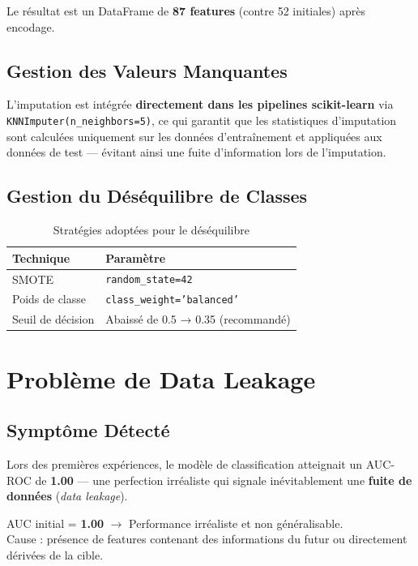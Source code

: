 \documentclass[12pt,a4paper]{article}
\begin{document}
Le résultat est un DataFrame de \textbf{87 features} (contre 52 initiales) après encodage.

\subsection{Gestion des Valeurs Manquantes}

L'imputation est intégrée \textbf{directement dans les pipelines scikit-learn} via
\texttt{KNNImputer(n\_neighbors=5)}, ce qui garantit que les statistiques d'imputation
sont calculées uniquement sur les données d'entraînement et appliquées aux données de test
— évitant ainsi une fuite d'information lors de l'imputation.

\subsection{Gestion du Déséquilibre de Classes}

\begin{table}[H]
\centering
\caption{Stratégies adoptées pour le déséquilibre}
\begin{tabular}{ll}
\toprule
\textbf{Technique} & \textbf{Paramètre} \\
\midrule
SMOTE & \texttt{random\_state=42} \\
Poids de classe & \texttt{class\_weight='balanced'} \\
Seuil de décision & Abaissé de 0.5 → 0.35 (recommandé) \\
\bottomrule
\end{tabular}
\end{table}

\section{Problème de Data Leakage}
\label{sec:leakage}

\subsection{Symptôme Détecté}

Lors des premières expériences, le modèle de classification atteignait un AUC-ROC de \textbf{1.00} —
une perfection irréaliste qui signale inévitablement une \textbf{fuite de données} (\textit{data leakage}).

\begin{warnbox}
AUC initial = \textbf{1.00} $\rightarrow$ Performance irréaliste et non généralisable.\\
Cause : présence de features contenant des informations du futur ou directement dérivées de la cible.
\end{warnbox}
\end{document}
